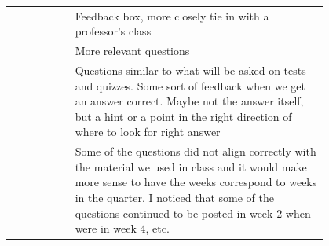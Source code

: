 \begin{longtable}{r|p{0.8\linewidth}}
		& Feedback box, more closely tie in with a professor's class                                                                                                                                                                                                                                                                                                                                                                                                                                                                                                                                                                                                                                                                                       \\
		& More relevant questions                                                                                                                                                                                                                                                                                                                                                                                                                                                                                                                                                                                                                                                                                                                          \\
		& Questions similar to what will be asked on tests and quizzes. Some sort of feedback when we get an answer correct. Maybe not the answer itself, but a hint or a point in the right direction of where to look for right answer                                                                                                                                                                                                                                                                                                                                                                                                                                                                                                                   \\
		& Some of the questions did not align correctly with the material we used in class and it would make more sense to have the weeks correspond to weeks in the quarter. I noticed that some of the questions continued to be posted in week 2 when were in week 4, etc.                                                                                                                                                                                                                                                                                                                                                                                                                                                                              \\

\end{longtable}
